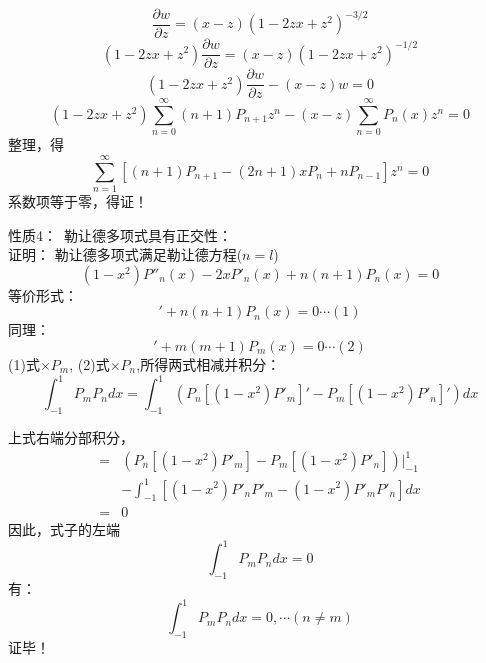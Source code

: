 \begin{frame}
	\begin{equation*}
		\frac{\partial w}{\partial z}=	(x-z)(1-2zx+z^2)^{-3/2}
	\end{equation*}		
	\begin{equation*}
		(1-2zx+z^2)\frac{\partial w}{\partial z}=(x-z)(1-2zx+z^2)^{-1/2}
	\end{equation*}		
	\begin{equation*}
		(1-2zx+z^2)\frac{\partial w}{\partial z}-(x-z)w=0
	\end{equation*}		
	\begin{equation*}
		(1-2zx+z^2)\sum_{n=0}^{\infty}(n+1) P_{n+1} z^{n}-(x-z)\sum_{n=0}^{\infty} P_{n}(x) z^{n}=0
	\end{equation*}		
	整理，得
	\begin{equation*}
		\sum_{n=1}^{\infty} [(n+1)P_{n+1} -(2n+1)x P_n + nP_{n-1} ] z^{n}=0
	\end{equation*}		
	系数项等于零，\alert{得证！}   	  
\end{frame}	

\begin{frame}
	\alert{性质4：}~勒让德多项式具有正交性：\\
	\alert{证明：}  勒让德多项式满足勒让德方程($n=l$)
	\begin{equation*}
		\left(1-x^{2}\right) P'' _n  (x) -2 x P' _n (x)+n(n+1)P_n(x)=0
	\end{equation*}		
	等价形式：
	\begin{equation*}
		[\left(1-x^{2}\right) P' _n  (x)]' +n(n+1)P_n(x)=0    \cdots  (1)
	\end{equation*}		
	同理：
	\begin{equation*}
		[\left(1-x^{2}\right) P' _m  (x)]' + m (m+1)P_m(x)=0    \cdots  (2)
	\end{equation*}		
	(1)式$\times P_m$, (2)式$\times P_n$,所得两式相减并积分： 
	{\small \begin{equation*}
			[n(n+1) -m (m+1)]\int_{-1}^{1} P_mP_n dx =\int_{-1}^{1} (P_n [\left(1-x^{2}\right) P' _m] '-P_m [\left(1-x^{2}\right) P' _n ]')dx
	\end{equation*}		}
\end{frame}	

\begin{frame}
	上式右端分部积分，
	\begin{equation*}
	\begin{split}
		= &(P_n [\left(1-x^{2}\right) P' _m] - P_m [\left(1-x^{2}\right) P' _n ])|_{-1} ^{1} \\ 
		&-\int_{-1}^{1}  [\left(1-x^{2}\right) P' _nP' _m -\left(1-x^{2}\right) P' _mP' _n  ]  dx \\
		=&0
	\end{split}
	\end{equation*}		
	因此，式子的左端
	\begin{equation*}
		[n(n+1) -m (m+1)]\int_{-1}^{1} P_mP_n dx =0
	\end{equation*}	
	有：
	\begin{equation*}
		\int_{-1}^{1} P_mP_n dx =0 ,\cdots (n\ne m)
	\end{equation*}	
	\alert{证毕！} 
\end{frame}	

